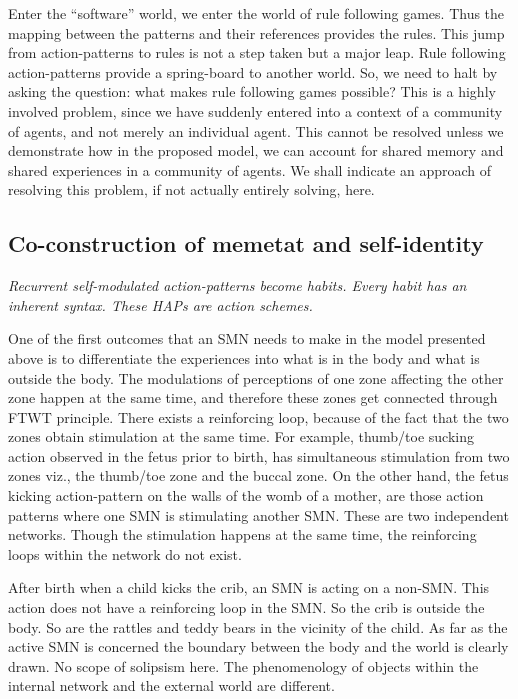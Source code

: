 Enter the ``software'' world, we enter the world of rule following games. Thus the mapping between the patterns and their references provides the rules. 
This jump from action-patterns to rules is not a step taken but a major leap. 
Rule following action-patterns provide a spring-board to another world. 
So, we need to halt by asking the question: what makes rule following games possible? 
This is a highly involved problem, since we have suddenly entered into a context of a community of agents, and not merely an individual agent. 
This cannot be resolved unless we demonstrate how in the proposed model, we can account for shared memory and shared experiences in a community of agents. 
We shall indicate an approach of resolving this problem, if not actually entirely solving, here. 

\subsection{Co-construction of memetat and self-identity}

\emph{Recurrent self-modulated action-patterns become habits. Every habit has an inherent syntax. These HAPs are \textit{action schemes}\cite{piaget1970genetic}.}

One of the first outcomes that an SMN needs to make in the model presented above is to differentiate the experiences into what is in the body and what is outside the body. 
The modulations of perceptions of one zone affecting the other zone happen at the same time, and therefore these zones get connected through FTWT principle. 
There exists a reinforcing loop, because of the fact that the two zones obtain stimulation at the same time. For example, thumb/toe sucking action observed in the fetus prior to birth, has simultaneous stimulation from two zones viz., the thumb/toe zone and the buccal zone. 
On the other hand, the fetus kicking action-pattern on the walls of the womb of a mother, are those action patterns where one SMN is stimulating another SMN. These are two independent networks. 
Though the stimulation happens at the same time, the reinforcing loops within the network do not exist. 

After birth when a child kicks the crib, an SMN is acting on a non-SMN. This action does not have a reinforcing loop in the SMN. So the crib is outside the body. So are the rattles and teddy bears in the vicinity of the child. 
As far as the active SMN is concerned the boundary between the body and the world is clearly drawn. No scope of solipsism here. The phenomenology of objects within the internal network and the external world are different. 

